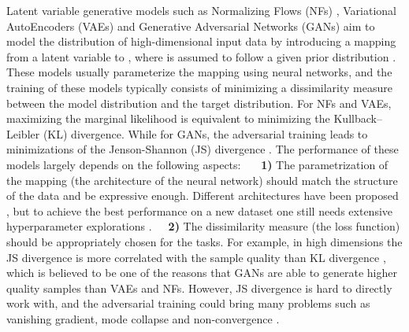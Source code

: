 \documentclass{article}
\begin{document}
\label{sec:introduction}

Latent variable generative models such as Normalizing Flows (NFs) \citep{rezende2015variational,dinh2014nice,dinh2016density,kingma2018glow}, Variational AutoEncoders (VAEs) \citep{kingma2013auto,rezende2014stochastic} and Generative Adversarial Networks (GANs) \citep{goodfellow2014generative, radford2015unsupervised} aim to model the distribution  of high-dimensional input data  by introducing a mapping from a latent variable  to , where  is assumed to follow a given prior distribution . These models usually parameterize the mapping using neural networks, and the training of these models typically consists of minimizing a dissimilarity measure between the model distribution and the target distribution. For NFs and VAEs, maximizing the marginal likelihood is equivalent to minimizing the Kullback–Leibler (KL) divergence. While for GANs, the adversarial training leads to minimizations of the Jenson-Shannon (JS) divergence \citep{goodfellow2014generative}. The performance of these models largely depends on the following aspects: \newline\ \ \ \textbf{1)} The parametrization of the mapping (the architecture of the neural network) should match the structure of the data and be expressive enough. Different architectures have been proposed \citep{kingma2018glow, van2017neural,karras2017progressive, karras2019style}, but to achieve the best performance on a new dataset one still needs extensive hyperparameter explorations \citep{lucic2018gans}.\newline \ \ \  \textbf{2)} The dissimilarity measure (the loss function) should be appropriately chosen for the tasks. For example, in high dimensions the JS divergence is more correlated with the sample quality than KL divergence \citep{huszar2015not, theis2015note}, which is believed to be one of the reasons that GANs are able to generate higher quality samples than VAEs and NFs. However, JS divergence is hard to directly work with, and the adversarial training could bring many problems such as vanishing gradient, mode collapse and non-convergence \citep{arjovsky2017towards, wiatrak2019stabilizing}.
\end{document}
